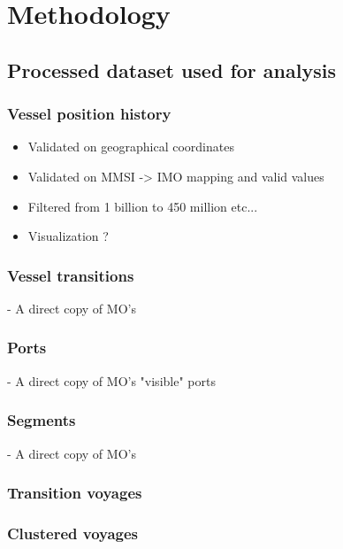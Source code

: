 \chapter{Methodology}

\section{Processed dataset used for analysis}

\subsection{Vessel position history}

\begin{itemize}
    \item Validated on geographical coordinates
    \item Validated on MMSI -> IMO mapping and valid values
    \item Filtered from 1 billion to 450 million etc...
    \item Visualization ?
\end{itemize}

\subsection{Vessel transitions}

 - A direct copy of MO's
 
 \subsection{Ports}
 
 - A direct copy of MO's "visible" ports
 
 \subsection{Segments}
 
 - A direct copy of MO's
 
 \subsection{Transition voyages}
 
 \subsection{Clustered voyages}
 